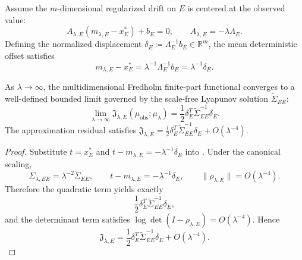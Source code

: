\begin{theorem}
  \label{thm:multidim_regularization}
  Assume the $m$-dimensional regularized drift on $E$ is centered at the observed value:
  \[
    A_{\lambda,E}(m_{\lambda,E}-x_E^*)+b_E=0,
    \qquad
    A_{\lambda,E}=-\lambda\Lambda_E.
  \]
  Defining the normalized displacement $\delta_E \coloneqq \Lambda_E^{-1} b_E \in \mathbb{R}^m$, the mean deterministic offset satisfies
  \[
    m_{\lambda,E}-x_E^*
    =
    \lambda^{-1}\Lambda_E^{-1}b_E
    =
    \lambda^{-1}\delta_E.
  \]

  As $\lambda \to \infty$, the multidimensional Fredholm finite-part functional converges to a well-defined bounded limit governed by the scale-free Lyapunov solution $\widetilde{\Sigma}_{EE}$:
  \begin{equation}
    \lim_{\lambda\to\infty} \mathfrak{J}_{\lambda,E}(\mu_{\mathrm{obs}}; \mu_\lambda) = \frac{1}{2} \delta_E^T \widetilde{\Sigma}_{EE}^{-1} \delta_E.
  \end{equation}
  The approximation residual satisfies $\mathfrak{J}_{\lambda,E} = \frac{1}{2} \delta_E^T \widetilde{\Sigma}_{EE}^{-1} \delta_E + O(\lambda^{-4})$.
\end{theorem}
\begin{proof}
  Substitute $t = x_E^*$ and $t - m_{\lambda,E} = -\lambda^{-1} \delta_E$ into . Under the canonical scaling,
  \[
    \Sigma_{\lambda,EE}
    =
    \lambda^{-2}\widetilde\Sigma_{EE},
    \qquad
    t-m_{\lambda,E}
    =
    -\lambda^{-1}\delta_E,
    \qquad
    \|\rho_{\lambda,E}\|=O(\lambda^{-4}).
  \]
  Therefore the quadratic term yields exactly
  \[
    \frac12
    \delta_E^T
    \widetilde\Sigma_{EE}^{-1}
    \delta_E,
  \]
  and the determinant term satisfies $\log\det(I-\rho_{\lambda,E})=O(\lambda^{-4})$. Hence
  \[
    \mathfrak{J}_{\lambda,E}
    =
    \frac12
    \delta_E^T
    \widetilde\Sigma_{EE}^{-1}
    \delta_E
    +
    O(\lambda^{-4}).
  \]
\end{proof}

